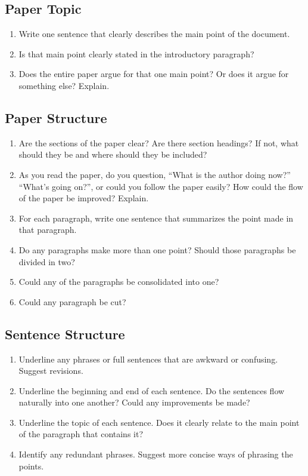 \documentclass[oneside]{article}
\begin{document}
\thispagestyle{fancy}

\addtocounter{section}{1}

\subsection{Paper Topic} 
\begin{enumerate}
\item Write one sentence that clearly describes the main point of the document.   
\item Is that main point clearly stated in the introductory paragraph? 
\item Does the entire paper argue for that one main point?  Or does it argue for something else?  Explain.
\end{enumerate}

\subsection{Paper Structure}

\begin{enumerate}
\item Are the sections of the paper clear? Are there section headings? If not, what should they be and where should they be included? 
\item As you read the paper, do you question, ``What is the author doing now?''  ``What's going on?'', or could you follow the paper easily?  How could the flow of the paper be improved?  Explain.
\item For each paragraph, write one sentence that summarizes the point made in that paragraph. 
\item Do any paragraphs make more than one point? Should those paragraphs be divided in two?
\item  Could any of the paragraphs be consolidated into one? 
\item  Could any paragraph be cut?   
\end{enumerate}

\subsection{Sentence Structure}  
\begin{enumerate}
\item Underline any phrases or full sentences that are awkward or confusing. Suggest revisions.
\item Underline the beginning and end of each sentence. Do the sentences flow naturally into one another? Could any improvements be made? 
\item Underline the topic of each sentence. Does it clearly relate to the main point of the paragraph that contains it? 
\item Identify any redundant phrases. Suggest more concise ways of phrasing the points.  
\end{enumerate}
\end{document}
